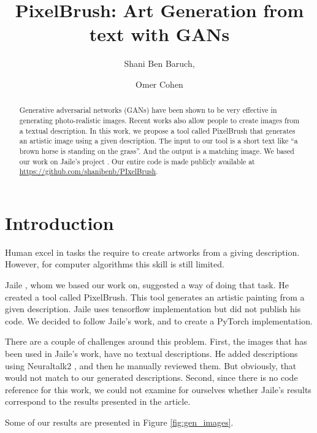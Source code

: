 \documentclass[a4paper]{article}
\title{\vspace{-2cm}PixelBrush: Art Generation from text with GANs}
\author{Shani Ben Baruch, 
\and Omer Cohen}
\date{}
\begin{document}
\maketitle

\begin{abstract}
Generative adversarial networks (GANs) have been shown to be very effective in generating photo-realistic images. Recent works also allow people to create images from a textual description. In this work, we propose a tool called PixelBrush that generates an artistic image using a given description. The input to our tool is a short text like “a brown horse is standing on the grass”. And the output is a matching image. We based our work on Jaile's project \cite{Zhi2017PixelBrush}. Our entire code is made publicly available at \url{https://github.com/shanibenb/PIxelBrush}.
\end{abstract}


\section{Introduction}
Human excel in tasks the require to create artworks from a giving description. However, for computer algorithms this skill is still limited.

Jaile \cite{Zhi2017PixelBrush}, whom we based our work on, suggested a way of doing that task. He created a tool called PixelBrush. This tool generates an artistic painting from a given description. Jaile uses tensorflow implementation but did not publish his code. We decided to follow Jaile's work, and to create a PyTorch implementation.

There are a couple of challenges around this problem. First, the images that has been used in Jaile's work, have no textual descriptions. He added descriptions using Neuraltalk2 \cite{karpathy2015deep}, and then he manually reviewed them. But obviously, that would not match to our generated descriptions. Second, since there is no code reference for this work, we could not examine for ourselves whether Jaile's results correspond to the results presented in the article.

Some of our results are presented in Figure \ref{fig:gen_images}.
\end{document}
